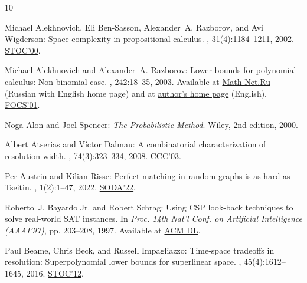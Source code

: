 \documentclass[11pt]{article}
\numberwithin{equation}{section}
\theoremstyle{definition}
\theoremstyle{plain}
\begin{document}
\tocrefpdfbookmark
\begin{thebibliography}{10}

{\sc Michael Alekhnovich, Eli {Ben-Sasson}, Alexander~A. Razborov, and Avi
  Wigderson}: Space complexity in propositional calculus.
, 31(4):1184--1211, 2002.
\newblock \prelim \href{https://doi.org/10.1145/335305.335347}{STOC'00}.
\newblock [\epfmtdoi{10.1137/S0097539700366735}]

{\sc Michael Alekhnovich and Alexander~A. Razborov}: Lower bounds for
  polynomial calculus: {N}on-binomial case.
, 242:18--35, 2003.
\newblock Available at \href{https://www.mathnet.ru/eng/tm403}{Math-Net.Ru}
  (Russian with English home page) and at
  \href{http://people.cs.uchicago.edu/~razborov/files/misha.pdf}{author's home
  page} (English). \prelim
  \href{https://doi.org/10.1109/SFCS.2001.959893}{FOCS'01}.

{\sc Noga Alon and Joel Spencer}: {\em The Probabilistic Method}.
\newblock Wiley, 2nd edition, 2000.
\newblock [\epfmtdoi{10.1002/0471722154}]

{\sc Albert Atserias and Víctor Dalmau}: A combinatorial characterization of
  resolution width.
, 74(3):323--334, 2008.
\newblock \prelim \href{https://doi.org/10.1109/CCC.2003.1214424}{CCC'03}.

{\sc Per Austrin and Kilian Risse}: Perfect matching in random graphs is as
  hard as {T}seitin.
, 1(2):1--47, 2022.
\newblock \prelim \href{https://doi.org/10.1137/1.9781611977073.43}{SODA'22}.

{\sc Roberto~J. {Bayardo Jr.} and Robert Schrag}: Using {CSP} look-back
  techniques to solve real-world {SAT} instances.
\newblock In {\em Proc. 14th Nat'l Conf. on Artificial Intelligence
  ({AAAI'97})}, pp. 203--208, 1997.
\newblock Available at
  \href{https://dl.acm.org/doi/10.5555/1867406.1867438}{ACM DL}.

{\sc Paul Beame, Chris Beck, and Russell Impagliazzo}: Time-space tradeoffs in
  resolution: {S}uperpolynomial lower bounds for superlinear space.
, 45(4):1612--1645, 2016.
\newblock \prelim \href{https://doi.org/10.1145/2213977.2213999}{STOC'12}.
\newblock [\epfmtdoi{10.1137/130914085}]


\end{thebibliography}
\end{document}
